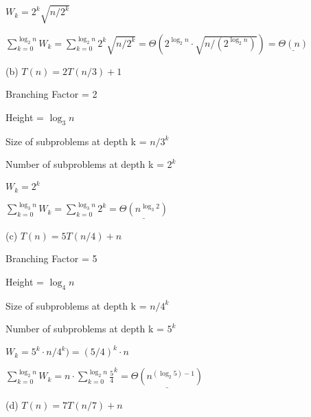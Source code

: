 \documentclass{article} %
\begin{document}
    \hspace{13pt} $W_k = 2^k \sqrt{n/2^k}$

    \hspace{13pt} $\sum^{\log_2 n}_{k = 0} W_k = \sum^{\log_2 n}_{k = 0} 2^k \sqrt{n/2^k} = \Theta(2^{\log_2n} \cdot \sqrt{n/(2^{\log_2n})}) = \underline{\Theta(n)}$

    \vspace{5pt}

    (b) $T(n) = 2T(n / 3) + 1$

    \hspace{13pt} Branching Factor = 2
    
    \hspace{13pt} Height = $\log_3n $

    \hspace{13pt} Size of subproblems at depth k = $n / 3^k$
    
    \hspace{13pt} Number of subproblems at depth k = $2^k$

    \hspace{13pt} $W_k = 2^k$

    \hspace{13pt} $\sum^{\log_3 n}_{k = 0} W_k = \sum^{\log_3 n}_{k = 0} 2^k = \underline{\Theta(n^{\log_3 2})}$
    
    \vspace{5pt}

    (c) $T(n) = 5T(n / 4) + n$

    \hspace{13pt} Branching Factor = 5
    
    \hspace{13pt} Height = $\log_4n $

    \hspace{13pt} Size of subproblems at depth k = $n / 4^k$
    
    \hspace{13pt} Number of subproblems at depth k = $5^k$

    \hspace{13pt} $W_k = 5^k \cdot n/4^k) = (5/4)^k \cdot n$

    \hspace{13pt} $\sum^{\log_2 n}_{k = 0} W_k = n \cdot \sum^{\log_2 n}_{k = 0} \frac{5}{4}^k = \underline{\Theta(n^{(\log_2 5) - 1})}$

    \vspace{5pt} 

    (d) $T(n) = 7T(n / 7) + n$
\end{document}

